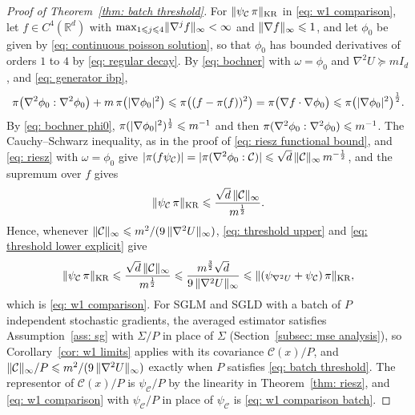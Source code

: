 \begin{proof}[Proof of Theorem~\ref{thm: batch threshold}]
    For $\lVert \psi_{\mathcal C}\, \pi \rVert_{\mathrm{KR}}$ in \eqref{eq: w1 comparison}, let $f \in C^4(\mathbb R^d)$ with $\max_{1 \leqslant j \leqslant 4} \lVert \nabla^j f \rVert_\infty < \infty$ and $\lVert \nabla f \rVert_\infty \leqslant 1$, and let $\phi_0$ be given by \eqref{eq: continuous poisson solution}, so that $\phi_0$ has bounded derivatives of orders $1$ to $4$ by \eqref{eq: regular decay}. By \eqref{eq: bochner} with $\omega = \phi_0$ and $\nabla^2 U \succeq m I_d$, and \eqref{eq: generator ibp},
    \begin{equation}
        \pi\bigl( \nabla^2 \phi_0 : \nabla^2 \phi_0 \bigr) + m\, \pi\bigl( |\nabla \phi_0|^2 \bigr) \leqslant \pi\bigl( (f - \pi(f))^2 \bigr) = \pi\bigl( \nabla f \cdot \nabla \phi_0 \bigr) \leqslant \pi\bigl( |\nabla \phi_0|^2 \bigr)^{\frac12} .
        \label{eq: bochner phi0}
    \end{equation}
    By \eqref{eq: bochner phi0}, $\pi(|\nabla \phi_0|^2)^{\frac12} \leqslant m^{-1}$ and then $\pi(\nabla^2 \phi_0 : \nabla^2 \phi_0) \leqslant m^{-1}$. The Cauchy--Schwarz inequality, as in the proof of \eqref{eq: riesz functional bound}, and \eqref{eq: riesz} with $\omega = \phi_0$ give $|\pi(f \psi_{\mathcal C})| = |\pi(\nabla^2 \phi_0 : \mathcal C)| \leqslant \sqrt d\, \lVert \mathcal C \rVert_\infty\, m^{-\frac12}$, and the supremum over $f$ gives
    \begin{equation}
        \lVert \psi_{\mathcal C}\, \pi \rVert_{\mathrm{KR}} \leqslant \frac{\sqrt d\, \lVert \mathcal C \rVert_\infty}{m^{\frac12}} .
        \label{eq: threshold upper}
    \end{equation}
    Hence, whenever $\lVert \mathcal C \rVert_\infty \leqslant m^2 / (9\, \lVert \nabla^2 U \rVert_\infty)$, \eqref{eq: threshold upper} and \eqref{eq: threshold lower explicit} give
    \begin{equation*}
        \lVert \psi_{\mathcal C}\, \pi \rVert_{\mathrm{KR}} \leqslant \frac{\sqrt d\, \lVert \mathcal C \rVert_\infty}{m^{\frac12}} \leqslant \frac{m^{\frac32} \sqrt d}{9\, \lVert \nabla^2 U \rVert_\infty} \leqslant \lVert ( \psi_{\nabla^2 U} + \psi_{\mathcal C} )\, \pi \rVert_{\mathrm{KR}} ,
    \end{equation*}
    which is \eqref{eq: w1 comparison}. For SGLM and SGLD with a batch of $P$ independent stochastic gradients, the averaged estimator satisfies Assumption~\ref{ass: sg} with $\Sigma/P$ in place of $\Sigma$ (Section~\ref{subsec: mse analysis}), so Corollary~\ref{cor: w1 limits} applies with its covariance $\mathcal C(x)/P$, and $\lVert \mathcal C \rVert_\infty / P \leqslant m^2 / (9\, \lVert \nabla^2 U \rVert_\infty)$ exactly when $P$ satisfies \eqref{eq: batch threshold}. The representor of $\mathcal C(x)/P$ is $\psi_{\mathcal C}/P$ by the linearity in Theorem~\ref{thm: riesz}, and \eqref{eq: w1 comparison} with $\psi_{\mathcal C}/P$ in place of $\psi_{\mathcal C}$ is \eqref{eq: w1 comparison batch}.
\end{proof}
